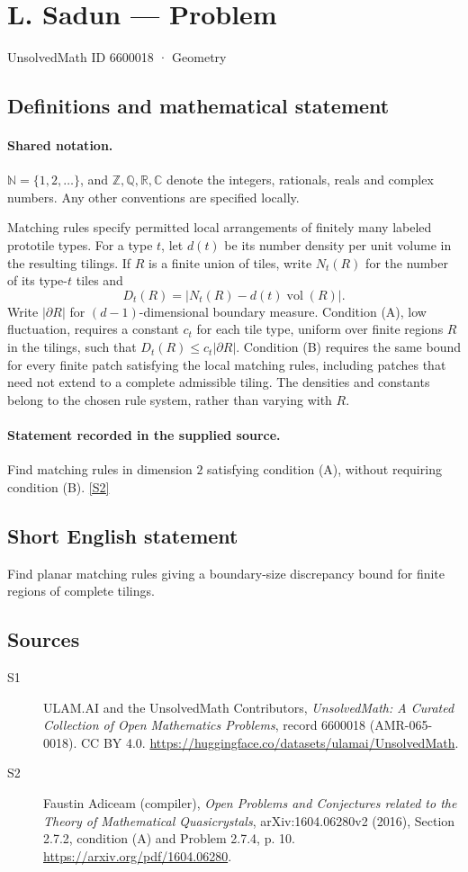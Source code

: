 \documentclass[11pt]{article}
\newcommand{\sref}[2]{\hyperlink{source:#1:#2}{[S#2]}}
\begin{document}
\setcounter{section}{6600017}
\section{L. Sadun — Problem}\label{6600018}
{\small\sffamily UnsolvedMath ID 6600018 · Geometry}
\subsection{Definitions and mathematical statement}

\paragraph{Shared notation.}$\mathbb N=\{1,2,\ldots\}$, and $\mathbb Z,\mathbb Q,\mathbb R,\mathbb C$ denote the integers, rationals, reals and complex numbers. Any other conventions are specified locally.


Matching rules specify permitted local arrangements of finitely many labeled prototile types. For a type $t$, let $d(t)$ be its number density per unit volume in the resulting tilings. If $R$ is a finite union of tiles, write $N_t(R)$ for the number of its type-$t$ tiles and
\[D_t(R)=|N_t(R)-d(t)\operatorname{vol}(R)|.\]
Write $|\partial R|$ for $(d-1)$-dimensional boundary measure. Condition (A), low fluctuation, requires a constant $c_t$ for each tile type, uniform over finite regions $R$ in the tilings, such that $D_t(R)\leq c_t|\partial R|$. Condition (B) requires the same bound for every finite patch satisfying the local matching rules, including patches that need not extend to a complete admissible tiling. The densities and constants belong to the chosen rule system, rather than varying with $R$.
\paragraph{Statement recorded in the supplied source.}
Find matching rules in dimension $2$ satisfying condition (A), without requiring condition (B). \sref{6600018}{2}
\subsection{Short English statement}
Find planar matching rules giving a boundary-size discrepancy bound for finite regions of complete tilings.
\subsection{Sources}
\begin{description}
\item[\hypertarget{source:6600018:1}{S1}] ULAM.AI and the UnsolvedMath Contributors, \emph{UnsolvedMath: A Curated Collection of Open Mathematics Problems}, record 6600018 (AMR-065-0018). CC BY 4.0. \url{https://huggingface.co/datasets/ulamai/UnsolvedMath}.
\item[\hypertarget{source:6600018:2}{S2}] Faustin Adiceam (compiler), \emph{Open Problems and Conjectures related to the Theory of Mathematical Quasicrystals}, arXiv:1604.06280v2 (2016), Section 2.7.2, condition (A) and Problem 2.7.4, p. 10. \url{https://arxiv.org/pdf/1604.06280}.
\end{description}
\label{end:6600018}
\end{document}
